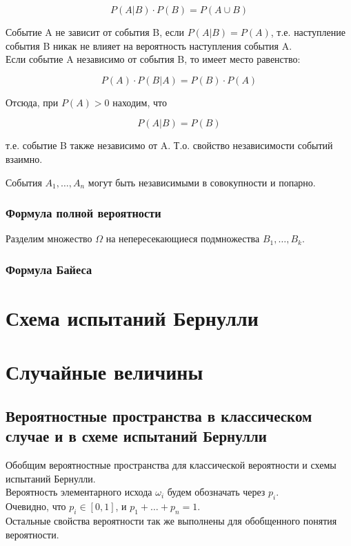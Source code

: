 \documentclass{article}
\theoremstyle{mydef}
\theoremstyle{myth}
\begin{document}
\begin{equation}
    P(A|B) \cdot P(B) = P(A \cup B)
\end{equation}

Событие A не зависит от события B, если $P(A|B) = P(A)$, т.е. наступление события B никак не влияет на вероятность наступления события A. \\
Если событие A независимо от события B, то имеет место равенство:

\begin{equation}
    P(A) \cdot P(B|A) = P(B) \cdot P(A)
\end{equation}

Отсюда, при $P(A)>0$ находим, что 

\begin{equation}
    P(A|B) = P(B)
\end{equation}

т.е. событие B также независимо от A. Т.о. свойство независимости событий взаимно.

События $A_1, \ldots, A_n$ могут быть независимыми в совокупности и попарно. 

\subsubsection{Формула полной вероятности}

Разделим множество $\Omega$ на непересекающиеся подмножества $B_1, \ldots, B_k$.

\subsubsection{Формула Байеса}

\section{Схема испытаний Бернулли}

\section{Случайные величины}

\subsection{Вероятностные пространства в классическом случае и в схеме испытаний Бернулли}

Обобщим вероятностные пространства для классической вероятности и схемы испытаний Бернулли. \\
Вероятность элементарного исхода $\omega_i$ будем обозначать через $p_i$. \\
Очевидно, что $p_i \in [0,1]$, и $p_1 + \ldots + p_n = 1$. \\
Остальные свойства вероятности так же выполнены для обобщенного понятия вероятности.
\end{document}

